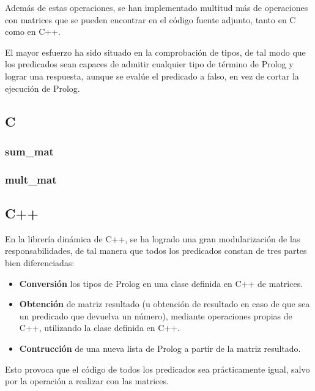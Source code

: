 \documentclass[a4paper,12pt]{article}
\begin{document}
Además de estas operaciones, se han implementado multitud más de operaciones con matrices que se pueden encontrar en el código fuente adjunto, tanto en C como en C++.

El mayor esfuerzo ha sido situado en la comprobación de tipos, de tal modo que los predicados sean capaces de admitir cualquier tipo de término de Prolog y lograr una respuesta, aunque se evalúe el predicado a falso, en vez de cortar la ejecución de Prolog.

\subsection{C}
\subsubsection{sum\_mat}
\subsubsection{mult\_mat}
\subsection{C++}

En la librería dinámica de C++, se ha logrado una gran modularización de las responsabilidades, de tal manera que todos los predicados constan de tres partes bien diferenciadas:
\begin{itemize}
\item \textbf{Conversión} los tipos de Prolog en una clase definida en C++ de matrices.
\item \textbf{Obtención} de matriz resultado (u obtención de resultado en caso de que sea un predicado que devuelva un número), mediante operaciones propias de C++, utilizando la clase definida en C++.
\item \textbf{Contrucción} de una nueva lista de Prolog a partir de la matriz resultado.
\end{itemize}

Esto provoca que el código de todos los predicados sea prácticamente igual, salvo por la operación a realizar con las matrices.
\end{document}
